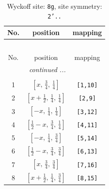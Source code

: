 \documentclass[fleqn,8pt]{jsarticle}
\begin{document}
\renewcommand{\arraystretch}{1.2}
\begin{longtable}{ccc}
\caption{Wyckoff site: {\tt 8g}, site symmetry: {\tt 2'..}}
 \\
 \hline \hline
No. & position & mapping \\ \hline \endfirsthead

\multicolumn{2}{l}{\tablename\ \thetable{}} \\
 \hline \hline
No. & position & mapping \\ \hline \endhead

 \hline \hline
\multicolumn{2}{r}{\footnotesize\it continued ...} \\ \endfoot

 \hline \hline
\multicolumn{2}{r}{} \\ \endlastfoot

1 & $\left[ x,\, \frac{3}{4},\, \frac{1}{4} \right]$ & {\tt [1,10]} \\ \hline
2 & $\left[ x + \frac{1}{2},\, \frac{1}{4},\, \frac{1}{4} \right]$ & {\tt [2,9]} \\ \hline
3 & $\left[ - x,\, \frac{1}{4},\, \frac{1}{4} \right]$ & {\tt [3,12]} \\ \hline
4 & $\left[ \frac{1}{2} - x,\, \frac{3}{4},\, \frac{1}{4} \right]$ & {\tt [4,11]} \\ \hline
5 & $\left[ - x,\, \frac{1}{4},\, \frac{3}{4} \right]$ & {\tt [5,14]} \\ \hline
6 & $\left[ \frac{1}{2} - x,\, \frac{3}{4},\, \frac{3}{4} \right]$ & {\tt [6,13]} \\ \hline
7 & $\left[ x,\, \frac{3}{4},\, \frac{3}{4} \right]$ & {\tt [7,16]} \\ \hline
8 & $\left[ x + \frac{1}{2},\, \frac{1}{4},\, \frac{3}{4} \right]$ & {\tt [8,15]} \\
\end{longtable}
\renewcommand{\arraystretch}{1.2}
\end{document}
